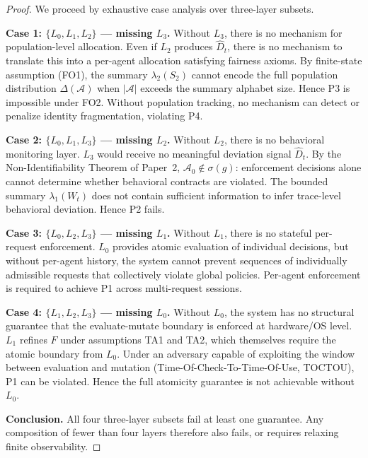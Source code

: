 \documentclass[11pt]{article}
\newcommand{\Agents}{\mathcal{A}}
\newcommand{\Azero}{\mathcal{A}_0}
\newcommand{\Dhat}{\widehat{D}}
\newcommand{\State}[1]{S_{#1}}
\newcommand{\Sum}[1]{\lambda_{#1}}
\newcommand{\Layer}[1]{L_{#1}}
\begin{document}
\begin{proof}
We proceed by exhaustive case analysis over three-layer subsets.

\textbf{Case 1: $\{\Layer{0}, \Layer{1}, \Layer{2}\}$ --- missing $\Layer{3}$.}
Without $\Layer{3}$, there is no mechanism for population-level allocation. Even if $\Layer{2}$ produces $\Dhat_t$, there is no mechanism to translate this into a per-agent allocation satisfying fairness axioms. By finite-state assumption (FO1), the summary $\Sum{2}(\State{2})$ cannot encode the full population distribution $\Delta(\Agents)$ when $|\Agents|$ exceeds the summary alphabet size. Hence P3 is impossible under FO2. Without population tracking, no mechanism can detect or penalize identity fragmentation, violating P4.

\textbf{Case 2: $\{\Layer{0}, \Layer{1}, \Layer{3}\}$ --- missing $\Layer{2}$.}
Without $\Layer{2}$, there is no behavioral monitoring layer. $\Layer{3}$ would receive no meaningful deviation signal $\Dhat_t$. By the Non-Identifiability Theorem of Paper~2, $\Azero \notin \sigma(g)$: enforcement decisions alone cannot determine whether behavioral contracts are violated. The bounded summary $\Sum{1}(W_t)$ does not contain sufficient information to infer trace-level behavioral deviation. Hence P2 fails.

\textbf{Case 3: $\{\Layer{0}, \Layer{2}, \Layer{3}\}$ --- missing $\Layer{1}$.}
Without $\Layer{1}$, there is no stateful per-request enforcement. $\Layer{0}$ provides atomic evaluation of individual decisions, but without per-agent history, the system cannot prevent sequences of individually admissible requests that collectively violate global policies. Per-agent enforcement is required to achieve P1 across multi-request sessions.

\textbf{Case 4: $\{\Layer{1}, \Layer{2}, \Layer{3}\}$ --- missing $\Layer{0}$.}
Without $\Layer{0}$, the system has no structural guarantee that the evaluate-mutate boundary is enforced at hardware/OS level. $\Layer{1}$ refines $F$ under assumptions TA1 and TA2, which themselves require the atomic boundary from $\Layer{0}$. Under an adversary capable of exploiting the window between evaluation and mutation (Time-Of-Check-To-Time-Of-Use, TOCTOU), P1 can be violated. Hence the full atomicity guarantee is not achievable without $\Layer{0}$.

\textbf{Conclusion.}
All four three-layer subsets fail at least one guarantee. Any composition of fewer than four layers therefore also fails, or requires relaxing finite observability.
\end{proof}
\end{document}
